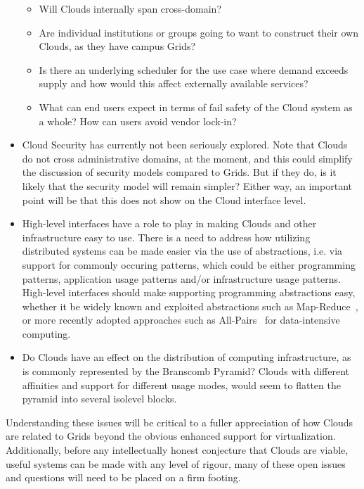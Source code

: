\documentclass[conference,final]{IEEEtran}
\begin{document}
\begin{itemize}
\begin{itemize}
    \item Will Clouds internally span cross-domain?  
    
    \item Are individual institutions or groups going to want to
    construct their own Clouds, as they have campus Grids?  
  
    \item Is there an underlying scheduler for the use case where
    demand exceeds supply and how would this affect externally
    available services?

    \item What can end users expect in terms of fail safety of the
    Cloud system as a whole?  How can users avoid vendor lock-in?

   \end{itemize}

  \item Cloud Security has currently not been seriously explored. Note
  that Clouds do not cross administrative domains, at the moment, and
  this could simplify the discussion of security models compared to
  Grids.  But if they do, is it likely that the security model will
  remain simpler? Either way, an important point will be that this
  does not show on the Cloud interface level.

  \item High-level interfaces have a role to play in making Clouds and
  other infrastructure easy to use.  There is a need to address how
  utilizing distributed systems can be made easier via the use of
  abstractions, i.e. via support for commonly occuring patterns, which
  could be either programming patterns, application usage patterns
  and/or infrastructure usage patterns.  High-level interfaces should
  make supporting programming abstractions easy, whether it be widely
  known and exploited abstractions such as
  Map-Reduce~\cite{mapreduce}, or more recently adopted approaches
  such as All-Pairs~\cite{allpairs} for data-intensive computing.

  \item Do Clouds have an effect on the distribution of computing
  infrastructure, as is commonly represented by the Branscomb
  Pyramid\cite{branscomb}?  Clouds with different affinities and
  support for different usage modes, would seem to flatten the pyramid
  into several isolevel blocks.

 \end{itemize}

 Understanding these issues will be critical to a fuller appreciation
 of how Clouds are related to Grids beyond the obvious enhanced
 support for virtualization.  Additionally, before any intellectually
 honest conjecture that Clouds are viable, useful systems can be made
 with any level of rigour, many of these open issues and questions
 will need to be placed on a firm footing.
\end{document}
